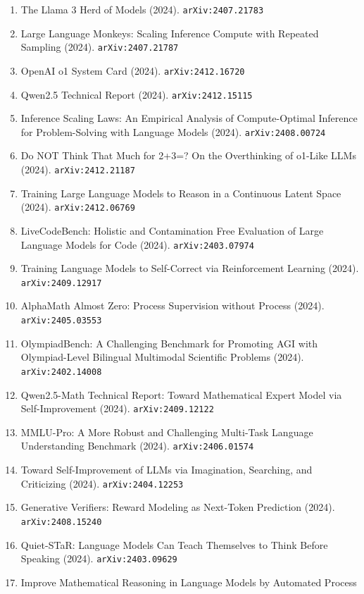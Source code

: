 \documentclass[11pt]{article}
\begin{document}
\begin{enumerate}
  Language Models (2024). \texttt{arXiv:2402.03300}
  \item The Llama 3 Herd of Models (2024). \texttt{arXiv:2407.21783}
  \item Large Language Monkeys: Scaling Inference Compute with Repeated Sampling (2024). \texttt{arXiv:2407.21787}
  \item OpenAI o1 System Card (2024). \texttt{arXiv:2412.16720}
  \item Qwen2.5 Technical Report (2024). \texttt{arXiv:2412.15115}
  \item Inference Scaling Laws: An Empirical Analysis of Compute-Optimal
  Inference for Problem-Solving with Language Models (2024). \texttt{arXiv:2408.00724}
  \item Do NOT Think That Much for 2+3=? On the Overthinking of o1-Like LLMs (2024). \texttt{arXiv:2412.21187}
  \item Training Large Language Models to Reason in a Continuous Latent Space (2024). \texttt{arXiv:2412.06769}
  \item LiveCodeBench: Holistic and Contamination Free Evaluation of Large
  Language Models for Code (2024). \texttt{arXiv:2403.07974}
  \item Training Language Models to Self-Correct via Reinforcement Learning (2024). \texttt{arXiv:2409.12917}
  \item AlphaMath Almost Zero: Process Supervision without Process (2024). \texttt{arXiv:2405.03553}
  \item OlympiadBench: A Challenging Benchmark for Promoting AGI with
  Olympiad-Level Bilingual Multimodal Scientific Problems (2024). \texttt{arXiv:2402.14008}
  \item Qwen2.5-Math Technical Report: Toward Mathematical Expert Model via
  Self-Improvement (2024). \texttt{arXiv:2409.12122}
  \item MMLU-Pro: A More Robust and Challenging Multi-Task Language
  Understanding Benchmark (2024). \texttt{arXiv:2406.01574}
  \item Toward Self-Improvement of LLMs via Imagination, Searching, and
  Criticizing (2024). \texttt{arXiv:2404.12253}
  \item Generative Verifiers: Reward Modeling as Next-Token Prediction (2024). \texttt{arXiv:2408.15240}
  \item Quiet-STaR: Language Models Can Teach Themselves to Think Before
  Speaking (2024). \texttt{arXiv:2403.09629}
  \item Improve Mathematical Reasoning in Language Models by Automated Process

\end{enumerate}
\end{document}

